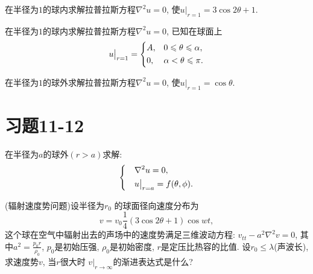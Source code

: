\begin{yyEx}
	在半径为$1$的球内求解拉普拉斯方程$\nabla^2u = 0$, 使$u|_{r = 1} = 3\cos 2\theta+1$.
\end{yyEx}

\begin{yyEx}
	在半径为$1$的球内求解拉普拉斯方程$\nabla^2u = 0$, 已知在球面上
	\begin{equation*}
		u\big|_{r = 1} = \begin{dcases}
			A,&0\leqslant \theta\leqslant \alpha,\\
			0,&\alpha<\theta\leqslant\pi.
		\end{dcases}
	\end{equation*}
\end{yyEx}

\begin{yyEx}
	在半径为$1$的球外求解拉普拉斯方程$\nabla^2u = 0$, 使$u|_{r = 1} = \cos\theta$.
\end{yyEx}

\section{习题11-12}

\begin{yyEx}
	在半径为$a$的球外$(r>a)$求解:
	\begin{equation*}
		\begin{dcases}
			&\nabla^2u = 0,\\
			&u\big|_{r = a} = f(\theta,\phi).
		\end{dcases}
	\end{equation*}
\end{yyEx}

\begin{yyEx}
	(辐射速度势问题)设半径为$r_0$ 的球面径向速度分布为 \begin{equation*}
		v = v_0\frac{1}{4}(3\cos 2\theta+1)\cos wt,
	\end{equation*}这个球在空气中辐射出去的声场中的速度势满足三维波动方程: $v_{tt}-a^2\nabla^2v = 0$, 其中$a^2 = \frac{p_0r}{\rho_0}$, $p_0$是初始压强, $\rho_0$是初始密度, $r$是定压比热容的比值. 设$r_0\leqslant \lambda$(声波长), 求速度势$v$, 当$r$很大时 $v|_{r\to\infty}$的渐进表达式是什么?
\end{yyEx}